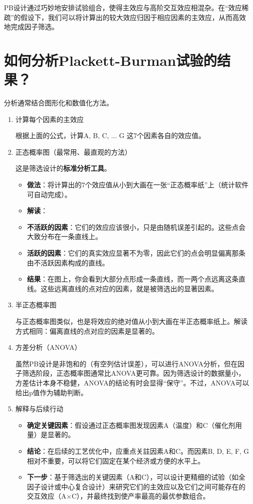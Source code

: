 \documentclass[fontset=windows,12pt]{ctexart}
\begin{document}
PB设计通过巧妙地安排试验组合，使得主效应与高阶交互效应相混杂。在“效应稀疏”的假设下，我们可以将计算出的较大效应归因于相应因素的主效应，从而高效地完成因子筛选。

\section{如何分析Plackett-Burman试验的结果？}

分析通常结合图形化和数值化方法。

\begin{enumerate}
	\item 计算每个因素的主效应

	根据上面的公式，计算A, B, C, ... G 这7个因素各自的效应值。

	\item 正态概率图（最常用、最直观的方法）

	这是筛选设计的\textbf{标准分析工具}。

	\begin{itemize}
		\item \textbf{做法}：将计算出的7个效应值从小到大画在一张“正态概率纸”上（统计软件可自动完成）。
		\item \textbf{解读}：
		\item \textbf{不活跃的因素}：它们的效应应该很小，只是由随机误差引起的。这些点会大致分布在一条直线上。
		\item \textbf{活跃的因素}：它们的真实效应显著不为零，因此它们的点会明显偏离那条由不活跃因素构成的直线。
		\item \textbf{结果}：在图上，你会看到大部分点形成一条直线，而一两个点远离这条直线。这些远离直线的点对应的因素，就是被筛选出的显著因素。
	\end{itemize}
		
	\item 半正态概率图

	与正态概率图类似，也是将效应的绝对值从小到大画在半正态概率纸上。解读方式相同：偏离直线的点对应的因素是显著的。

	\item 方差分析（ANOVA）

	虽然PB设计是非饱和的（有空列估计误差），可以进行ANOVA分析，但在因子筛选阶段，正态概率图通常比ANOVA更可靠。因为筛选设计的数据量小，方差估计本身不稳健，ANOVA的结论有时会显得“保守”。不过，ANOVA可以给出p值作为辅助判断。

	\item 解释与后续行动


	\begin{itemize}
		\item \textbf{确定关键因素}：假设通过正态概率图发现因素A（温度）和C（催化剂用量）是显著的。
		\item \textbf{结论}：在后续的工艺优化中，应重点关註因素A和C。而因素B, D, E, F, G相对不重要，可以将它们固定在某个经济或方便的水平上。
		\item \textbf{下一步}：基于筛选出的关键因素（A和C），可以设计更精细的试验（如全因子设计或中心复合设计）来研究它们的主效应以及它们之间可能存在的交互效应（A×C），并最终找到使产率最高的最优参数组合。
	\end{itemize}

\end{enumerate}
\end{document}
